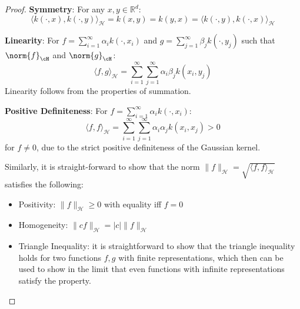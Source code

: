 \begin{proof}

\textbf{Symmetry}: For any $x,y \in \mathbb{R}^d$:
   $$\langle k(\cdot,x), k(\cdot,y)\rangle_\mathcal{H} = k(x,y) = k(y,x) = \langle k(\cdot,y), k(\cdot,x)\rangle_\mathcal{H}$$

\textbf{Linearity}: For $f = \sum_{i=1}^\infty \alpha_i k(\cdot,x_i)$ and $g = \sum_{j=1}^\infty \beta_j k(\cdot,y_j)$ such that $\norm{f}_{\cH}$ and $\norm{g}_{\cH}$:
   $$\langle f, g\rangle_\mathcal{H} = \sum_{i=1}^\infty \sum_{j=1}^\infty \alpha_i \beta_j k(x_i,y_j)$$
   Linearity follows from the properties of summation.

\textbf{Positive Definiteness}: For $f = \sum_{i=1}^\infty \alpha_i k(\cdot,x_i)$:
   $$\langle f,f\rangle_\mathcal{H} = \sum_{i=1}^\infty \sum_{j=1}^\infty \alpha_i \alpha_j k(x_i,x_j) > 0$$
   for $f \neq 0$, due to the strict positive definiteness of the Gaussian kernel.

Similarly, it is straight-forward to show that the norm $\|f\|_\mathcal{H} = \sqrt{\langle f,f\rangle_\mathcal{H}}$ satisfies the following:
\begin{itemize}
    \item Positivity: $\|f\|_\mathcal{H} \geq 0$ with equality iff $f = 0$
    \item Homogeneity: $\|cf\|_\mathcal{H} = |c| \|f\|_\mathcal{H}$
    \item Triangle Inequality: it is straightforward to show that the triangle inequality holds for two functions $f,g$ with finite representations, which then can be used to show in the limit that even functions with infinite representations satisfy the property.
\end{itemize}
\end{proof}



